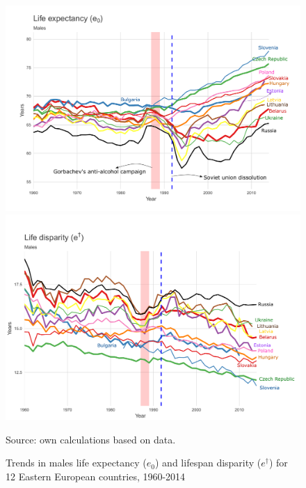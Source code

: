 \documentclass{article}
\begin{document}
\begin{figure}[h!]
\centering
\caption{Trends in males life expectancy ($e_0$) and lifespan disparity  ($e^{\dagger}$) for 12 Eastern European countries, 1960-2014}
\label{Fig_LE&LD}
\begin{center}
\includegraphics[scale=.40]{Figures/ex_males.pdf}
\includegraphics[scale=.40]{Figures/ed_males.pdf}
\end{center}
Source: own calculations based on \citet{HMD} data. 
\end{figure}

\newpage
\end{document}
